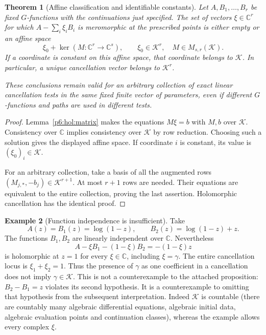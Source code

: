 \documentclass[11pt,a4paper]{article}
\newtheorem{theorem}{Theorem}[section]
\theoremstyle{definition}
\newtheorem{example}[theorem]{Example}
\theoremstyle{remark}
\numberwithin{equation}{section}
\begin{document}
\begin{theorem}[Affine classification and identifiable constants]
\label{p6:hol:affine}
Let $A,B_1,\ldots,B_r$ be fixed $G$-functions with the continuations
just specified.  The set of vectors $\xi\in\mathbb C^r$ for which
$A-\sum_i\xi_iB_i$ is meromorphic at the prescribed points is
either empty or an affine space
\[
 \xi_0+\ker(M:\mathbb C^r\longrightarrow\mathbb C^s),
 \qquad \xi_0\in\mathcal K^r,\quad M\in M_{s,r}(\mathcal K).
\]
If a coordinate is constant on this affine space, that coordinate
belongs to $\mathcal K$.  In particular, a unique cancellation
vector belongs to $\mathcal K^r$.

These conclusions remain valid for an arbitrary collection of
exact linear cancellation tests in the same fixed finite vector
of parameters, even if different $G$-functions and paths are used
in different tests.
\end{theorem}
\begin{proof}
Lemma~\ref{p6:hol:matrix} makes the equations $M\xi=b$ with
$M,b$ over $\mathcal K$.  Consistency over $\mathbb C$ implies
consistency over $\mathcal K$ by row reduction.  Choosing such a
solution gives the displayed affine space.  If coordinate $i$
is constant, its value is $(\xi_0)_i\in\mathcal K$.

For an arbitrary collection, take a basis of all the augmented
rows $(M_{j,*},-b_j)\in\mathcal K^{r+1}$.  At most $r+1$ rows
are needed.  Their equations are equivalent to the entire
collection, proving the last assertion.  Holomorphic cancellation
has the identical proof.
\end{proof}

\begin{example}[Function independence is insufficient]
\label{p6:hol:free-example}
Take
\[
 A(z)=B_1(z)=\log(1-z),\qquad B_2(z)=\log(1-z)+z.
\]
The functions $B_1,B_2$ are linearly independent over $\mathbb C$.
Nevertheless
\[
 A-\xi B_1-(1-\xi)B_2=-(1-\xi)z
\]
is holomorphic at $z=1$ for every $\xi\in\mathbb C$, including
$\xi=\gamma$.  The entire cancellation locus is $\xi_1+\xi_2=1$.
Thus the presence of $\gamma$ as one coefficient in a cancellation
does not imply $\gamma\in\mathcal K$.  This is not a counterexample
to the attached proposition: $B_2-B_1=z$ violates its second
hypothesis.  It is a counterexample to omitting that hypothesis
from the subsequent interpretation.  Indeed $\mathcal K$ is
countable (there are countably many algebraic differential equations,
algebraic initial data, algebraic evaluation points and continuation
classes), whereas the example allows every complex $\xi$.
\end{example}
\end{document}
